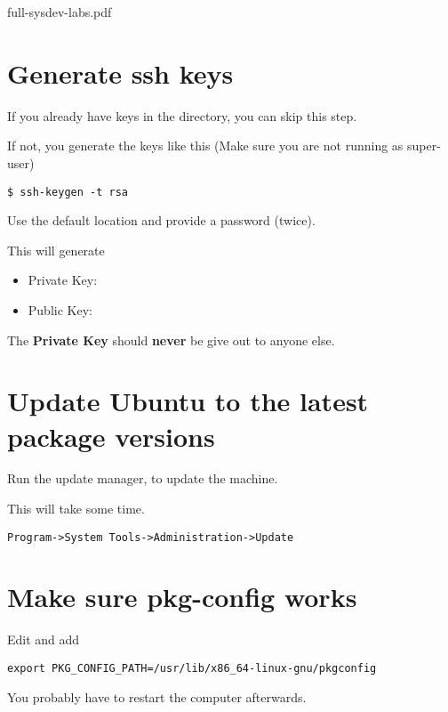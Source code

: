 \clearpage full-sysdev-labs.pdf 
\section{Generate ssh keys}

If you already have  keys in the  directory, 
you can skip this step.

If not, you generate the keys like this (Make sure you are not running as super-user)

\begin{verbatim}
$ ssh-keygen -t rsa
\end{verbatim}

Use the default location and provide a password (twice).

This will generate 

\begin{itemize}

\item Private Key: 

\item Public Key: 

\end{itemize}

The {\bf Private Key} should {\bf never} be give out to anyone else.

\section{Update Ubuntu to the latest package versions}




Run the update manager, to update the machine.

This will take some time.


\begin{verbatim}
Program->System Tools->Administration->Update
\end{verbatim}

\section{Make sure pkg-config works}

Edit  and add

\begin{verbatim}
export PKG_CONFIG_PATH=/usr/lib/x86_64-linux-gnu/pkgconfig
\end{verbatim}



You probably have to restart the computer afterwards.

